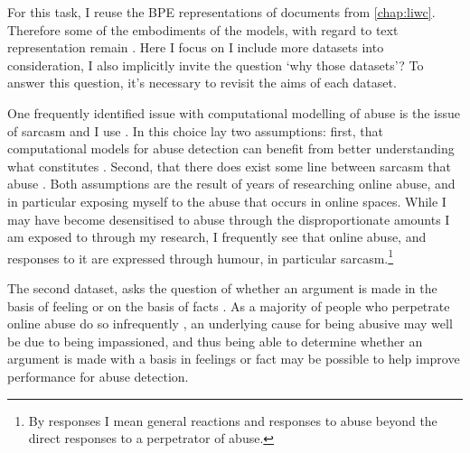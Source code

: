 For this task, I reuse the BPE representations of documents from \autoref{chap:liwc}.
Therefore some of the embodiments of the models, with regard to text representation remain .
Here I focus on 
 I include more datasets into consideration, I also implicitly invite the question `why those datasets'?
To answer this question, it's necessary to revisit the aims of each dataset.

One frequently identified issue with computational modelling of abuse is the issue of sarcasm \citep{Rottger:2021} and I use \citet{Oraby_sarcasm:2016}.
In this choice lay two assumptions: first, that computational models for abuse detection can benefit from better understanding what constitutes .
Second, that there does exist some line between  sarcasm  that  abuse .
Both assumptions are the result of years of researching online abuse, and in particular exposing myself to the abuse that occurs in online spaces.
While I may have become desensitised to abuse through the disproportionate amounts I am exposed to through my research, I frequently see that online abuse, and responses to it are expressed through humour, in particular sarcasm.\footnote{By responses I mean general reactions and responses to abuse beyond the direct responses to a perpetrator of abuse.}

The second dataset, asks the question of whether an argument is made in the basis of feeling or on the basis of facts \citep{Oraby_factfeel:2015}.
As a majority of people who perpetrate online abuse do so infrequently \citep{Waseem-Hovy:2016}, an underlying cause for being abusive may well be due to being impassioned, and thus being able to determine whether an argument is made with a basis in feelings or fact may be possible to help improve performance for abuse detection.

